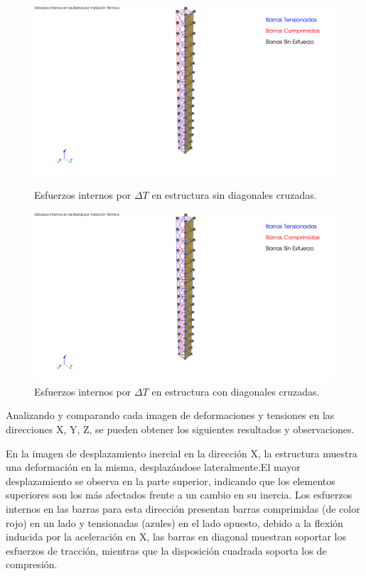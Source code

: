 \begin{figure}[H]
    \centering
    \begin{minipage}{0.45\textwidth}
        \centering
        \includegraphics[width=\textwidth]{GRAFICOS/Esfuerzos Internos en las Barras por Variación Térmica False.png}
        \caption{Esfuerzos internos por $\Delta T$ en estructura sin diagonales cruzadas.}
        \label{fig:imagen77}
    \end{minipage}
    \hfill
    \begin{minipage}{0.45\textwidth}
        \centering
        \includegraphics[width=\textwidth]{GRAFICOS/Esfuerzos Internos en las Barras por Variación Térmica True.png}
        \caption{Esfuerzos internos por $\Delta T$ en estructura con diagonales cruzadas.}
        \label{fig:imagen88}
    \end{minipage}
\end{figure}

Analizando y comparando cada imagen de deformaciones y tensiones en las direcciones X, Y, Z, se pueden obtener los siguientes resultados y observaciones.

En la imagen de desplazamiento inercial en la dirección X, la estructura muestra una deformación en la misma, desplazándose lateralmente.El mayor desplazamiento se observa en la parte superior, indicando que los elementos superiores son los más afectados frente a un cambio en su inercia. Los esfuerzos internos en las barras para esta dirección presentan barras comprimidas (de color rojo) en un lado y tensionadas (azules) en el lado opuesto, debido a la flexión inducida por la aceleración en X, las barras en diagonal muestran soportar los esfuerzos de tracción, mientras que la disposición cuadrada soporta los de compresión.

